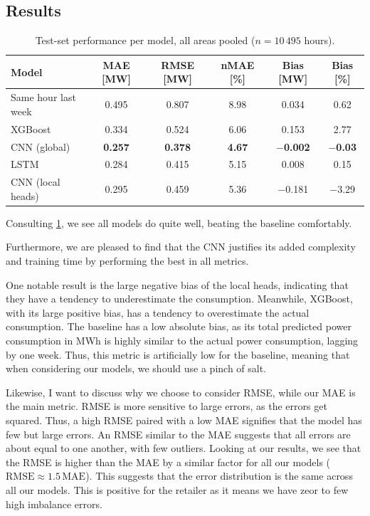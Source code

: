 \documentclass[11pt,a4paper]{article}
\begin{document}
\subsection{Results}
\begin{table}[H]
\centering
\caption{Test-set performance per model, all areas pooled ($n = 10\,495$ hours).}
\label{tab:results}
\begin{tabular}{lccccc}
\toprule
Model & MAE [MW] & RMSE [MW] & nMAE [\%] & Bias [MW] & Bias [\%] \\
\midrule
Same hour last week & 0.495 & 0.807 & 8.98 & 0.034 & 0.62 \\
XGBoost             & 0.334 & 0.524 & 6.06 & 0.153 & 2.77 \\
CNN (global)        & \textbf{0.257} & \textbf{0.378} & \textbf{4.67} & \textbf{$-$0.002} & \textbf{$-$0.03} \\
LSTM                & 0.284 & 0.415 & 5.15 & 0.008 & 0.15 \\
CNN (local heads)   & 0.295 & 0.459 & 5.36 & $-$0.181 & $-$3.29 \\
\bottomrule
\end{tabular}
\end{table}

Consulting \cref{tab:results}, we see all models do quite well, beating the baseline comfortably.

Furthermore, we are pleased to find that the CNN justifies its added complexity and training time by performing the best in all metrics.

One notable result is the large negative bias of the local heads, indicating that they have a tendency to underestimate the consumption. Meanwhile, XGBoost, with its large positive bias, has a tendency to overestimate the actual consumption. The baseline has a low absolute bias, as its total predicted power consumption in MWh is highly similar to the actual power consumption, lagging by one week. Thus, this metric is artificially low for the baseline, meaning that when considering our models, we should use a pinch of salt.

Likewise, I want to discuss why we choose to consider RMSE, while our MAE is the main metric. RMSE is more sensitive to large errors, as the errors get squared. Thus, a high RMSE paired with a low MAE signifies that the model has few but large errors. An RMSE similar to the MAE suggests that all errors are about equal to one another, with few outliers. Looking at our results, we see that the RMSE is higher than the MAE by a similar factor for all our models ($\text{RMSE} \approx 1.5\,\text{MAE}$). This suggests that the error distribution is the same across all our models. This is positive for the retailer as it means we have zeor to few high imbalance errors.
\end{document}

